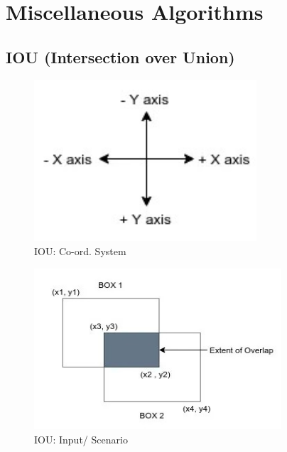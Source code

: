 \chapter{Miscellaneous Algorithms}

\section{IOU (Intersection over Union) \cite{medium/analytics-vidhya/iou-intersection-over-union-705a39e7acef}}\label{IOU (Intersection over Union)}

\begin{table}[H]
    \begin{minipage}[b]{0.325\linewidth}
        \begin{figure}[H]
            \centering
            \includegraphics[width=\linewidth, height=6cm, keepaspectratio]{Pictures/ds-algo/iou-cs.jpg}
            \caption{IOU: Co-ord. System}
        \end{figure}
    \end{minipage}
    \hfill
    \begin{minipage}[b]{0.325\linewidth}
        \begin{figure}[H]
            \centering
            \includegraphics[width=\linewidth, height=6cm, keepaspectratio]{Pictures/ds-algo/iou-1.jpg}
            \caption{IOU: Input/ Scenario}
        \end{figure}

\end{minipage}
\end{table}
